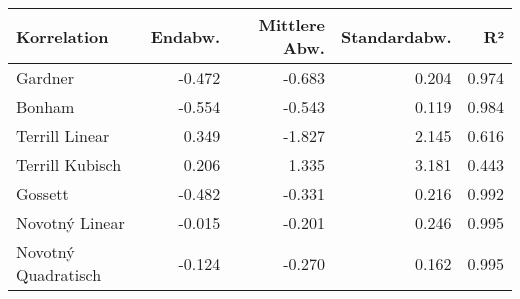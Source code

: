 \begin{tabular}{lrrrr}
\toprule
        Korrelation &  Endabw. &  Mittlere Abw. &  Standardabw. &    R² \\
\midrule
            Gardner &   -0.472 &         -0.683 &         0.204 & 0.974 \\
             Bonham &   -0.554 &         -0.543 &         0.119 & 0.984 \\
     Terrill Linear &    0.349 &         -1.827 &         2.145 & 0.616 \\
    Terrill Kubisch &    0.206 &          1.335 &         3.181 & 0.443 \\
            Gossett &   -0.482 &         -0.331 &         0.216 & 0.992 \\
     Novotný Linear &   -0.015 &         -0.201 &         0.246 & 0.995 \\
Novotný Quadratisch &   -0.124 &         -0.270 &         0.162 & 0.995 \\
\bottomrule
\end{tabular}
